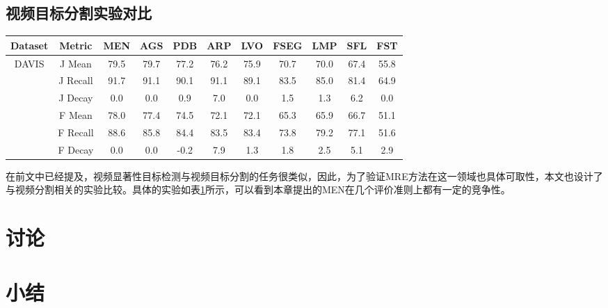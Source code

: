 \subsection{视频目标分割实验对比}
\begin{table}[]
\label{compare_all_seg}
\begin{tabular}{|c|c|ccccccccc}
\hline
Dataset & Metric & \multicolumn{1}{c|}{MEN} & \multicolumn{1}{c|}{AGS} & \multicolumn{1}{c|}{PDB} & \multicolumn{1}{c|}{ARP} & \multicolumn{1}{c|}{LVO} & \multicolumn{1}{c|}{FSEG} & \multicolumn{1}{c|}{LMP} & \multicolumn{1}{c|}{SFL} & \multicolumn{1}{c|}{FST} \\ \hline
\multirow{6}{*}{DAVIS} & J Mean & 79.5 & 79.7 & 77.2 & 76.2 & 75.9 & 70.7 & 70.0 & 67.4 & 55.8 \\
 & J Recall & 91.7 & 91.1 & 90.1 & 91.1 & 89.1 & 83.5 & 85.0 & 81.4 & 64.9 \\
 & J Decay & 0.0 & 0.0 & 0.9 & 7.0 & 0.0 & 1.5 & 1.3 & 6.2 & 0.0 \\ \cline{2-11} 
 & F Mean & 78.0 & 77.4 & 74.5 & 72.1 & 72.1 & 65.3 & 65.9 & 66.7 & 51.1 \\
 & F Recall & 88.6 & 85.8 & 84.4 & 83.5 & 83.4 & 73.8 & 79.2 & 77.1 & 51.6 \\
 & F Decay & 0.0 & 0.0 & -0.2 & 7.9 & 1.3 & 1.8 & 2.5 & 5.1 & 2.9 \\ \hline
\end{tabular}
\end{table}
在前文中已经提及，视频显著性目标检测与视频目标分割的任务很类似，因此，为了验证MRE方法在这一领域也具体可取性，本文也设计了与视频分割相关的实验比较。具体的实验如表\ref{compare_all_seg}所示，可以看到本章提出的MEN在几个评价准则上都有一定的竞争性。

\section{讨论}
\Blindtext

\section{小结}
\Blindtext 